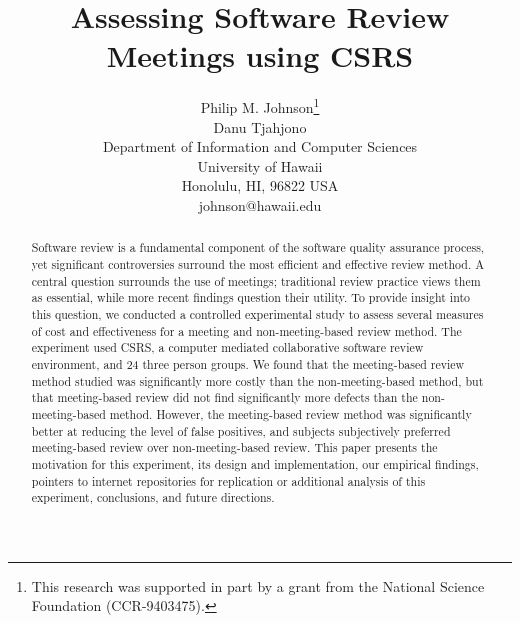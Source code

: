 





\title{{\bf Assessing Software Review Meetings using CSRS}}

\author{
        Philip M. Johnson\thanks{This research was supported
        in part by a grant  from the National Science Foundation (CCR-9403475).}\\ 
        Danu Tjahjono\\
        Department of Information and Computer Sciences\\
        University of Hawaii\\
        Honolulu, HI, 96822 USA\\
        johnson@hawaii.edu
      }

\maketitle

\begin{abstract}
  
  Software review is a fundamental component of the software quality
  assurance process, yet significant controversies surround the most
  efficient and effective review method. A central question surrounds the
  use of meetings; traditional review practice views them as essential,
  while more recent findings question their utility.  To provide insight
  into this question, we conducted a controlled experimental study to
  assess several measures of cost and effectiveness for a meeting and
  non-meeting-based review method.  The experiment used CSRS, a computer
  mediated collaborative software review environment, and 24 three person
  groups.  We found that the meeting-based review method studied was
  significantly more costly than the non-meeting-based method, but that
  meeting-based review did not find significantly more defects than the
  non-meeting-based method. However, the meeting-based review method was
  significantly better at reducing the level of false positives, and
  subjects subjectively preferred meeting-based review over
  non-meeting-based review.  This paper presents the motivation for this
  experiment, its design and implementation, our empirical findings,
  pointers to internet repositories for replication or additional analysis
  of this experiment, conclusions, and future directions.

\end{abstract}

